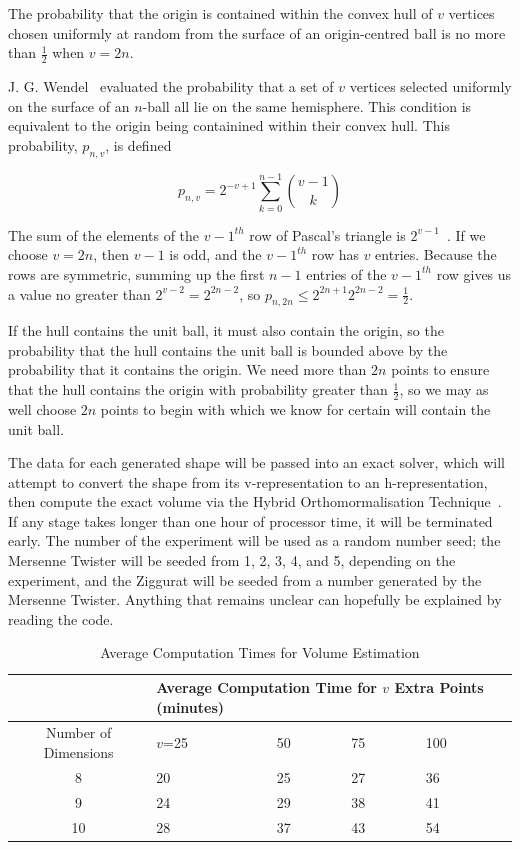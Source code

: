 \begin{proposition}
The probability that the origin is contained within the convex hull of $v$ vertices chosen uniformly at random from the surface of an origin-centred ball is no more than $\frac{1}{2}$ when $v = 2n$.
\end{proposition}

J. G. Wendel~\cite{Wendel62} evaluated the probability that a set of $v$ vertices selected uniformly on the surface of an $n$-ball all lie on the same hemisphere. This condition is equivalent to the origin being containined within their convex hull. This probability, $p_{n,v}$, is defined

$$
p_{n,v} = 2^{-v+1} \sum_{k=0}^{n-1} {{v-1} \choose k}
$$

The sum of the elements of the $v-1^{th}$ row of Pascal's triangle is $2^{v-1}$~\cite{mathworld_pascal}. If we choose $v = 2n$, then $v-1$ is odd, and the $v-1^{th}$ row has $v$ entries. Because the rows are symmetric, summing up the first $n-1$ entries of the $v-1^{th}$ row gives us a value no greater than $2^{v-2} = 2^{2n-2}$, so $p_{n, 2n} \leqslant 2^{2n+1} 2^{2n-2} = \frac{1}{2}$.

If the hull contains the unit ball, it must also contain the origin, so the probability that the hull contains the unit ball is bounded above by the probability that it contains the origin. We need more than $2n$ points to ensure that the hull contains the origin with probability greater than $\frac{1}{2}$, so we may as well choose $2n$ points to begin with which we know for certain will contain the unit ball.

The data for each generated shape will be passed into an exact solver, which will attempt to convert the shape from its v-representation to an h-representation, then compute the exact volume via the Hybrid Orthomormalisation Technique~\cite{Bueler98}. If any stage takes longer than one hour of processor time, it will be terminated early. The number of the experiment will be used as a random number seed; the Mersenne Twister will be seeded from 1, 2, 3, 4, and 5, depending on the experiment, and the Ziggurat will be seeded from a number generated by the Mersenne Twister. Anything that remains unclear can hopefully be explained by reading the code. %

\begin{table}[h]
\centering
\begin{tabular}{| c || p{1cm} | p{1cm} | p{1cm} | p{1cm}|}
\hline
&\multicolumn{4}{p{5cm}|}{Average Computation Time for $v$ Extra Points (minutes)} \\
\hline
Number of Dimensions & $v$=25 & 50 & 75 & 100\\
\hline
8  & 20 & 25 & 27 & 36 \\
9  & 24 & 29 & 38 & 41 \\
10 & 28 & 37 & 43 & 54 \\
\hline
\end{tabular}
\caption{Average Computation Times for Volume Estimation}
\label{tab_estimation_time}
\end{table}

